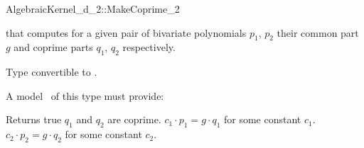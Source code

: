 \begin{ccRefConcept}{AlgebraicKernel_d_2::MakeCoprime_2}

\ccDefinition

 that computes for a given pair of 
bivariate polynomials $p_1$, $p_2$ their common part $g$ and 
coprime parts $q_1$, $q_2$ respectively.


        { Type convertible to .}


A model \ccVar\ of this type must provide:

{
Returns true $q_1$ and $q_2$ are coprime. 
\ccPostcond $c_1 \cdot p_1 =  g \cdot q_1$ for some constant $c_1$.
\ccPostcond $c_2 \cdot p_2 =  g \cdot q_2$ for some constant $c_2$.
}

\ccSeeAlso

\end{ccRefConcept}
